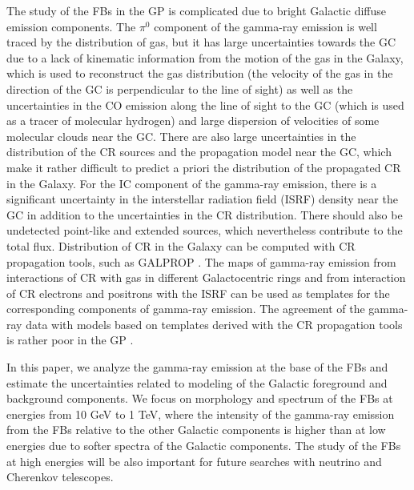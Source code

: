The study of the FBs in the GP is complicated due to bright Galactic diffuse emission components.
The $\pi^0$ component of the gamma-ray emission is well traced by the distribution of gas,
but it has large uncertainties towards the GC due to a lack of kinematic information from the motion of the gas in the 
Galaxy, which is used to reconstruct the gas distribution
(the velocity of the gas in the direction of the GC is perpendicular to the line of sight)
as well as the uncertainties in the CO emission along the line of sight to the GC (which is used as a tracer of molecular hydrogen)
and large dispersion of velocities of some molecular clouds near the GC. 
There are also large uncertainties in the distribution of the CR sources and the propagation model near the GC,
which make it rather difficult to predict a priori 
the distribution of the propagated CR in the Galaxy.
For the IC component of the gamma-ray emission, 
there is a significant uncertainty in the interstellar radiation field (ISRF) density near the GC 
\citep[][]{2017MNRAS.470.2539P, 2017ApJ...846...67P,  2019APh...107....1N} in addition to 
the uncertainties in the CR distribution.
There should also be undetected point-like and extended sources, which nevertheless contribute to the total flux.
Distribution of CR in the Galaxy can be computed with CR propagation tools, such as GALPROP \citep{2007ARNPS..57..285S}.
The maps of gamma-ray emission from interactions of CR with gas in different Galactocentric rings and from interaction
of CR electrons and positrons with the ISRF can be used as templates for the corresponding components
of gamma-ray emission.
The agreement of the gamma-ray data with models based on templates derived with the CR propagation tools
is rather poor in the GP %
\citep[e.g.,][]{2017ApJ...846...67P}.

In this paper, we analyze the gamma-ray emission at the base of the FBs and 
estimate the uncertainties %
related to modeling of the Galactic foreground and background components.
We focus on morphology and spectrum of the FBs at energies from 10 GeV to 1 TeV,
where the intensity of the gamma-ray emission from the FBs 
relative to the other Galactic components
is higher than at low energies due to softer spectra of the Galactic components.
The study of the FBs at high energies will be also important for future searches with neutrino and Cherenkov telescopes.

